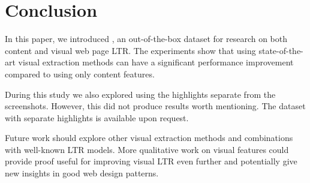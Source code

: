 
\section{Conclusion}
In this paper, we introduced \datasetname, an out-of-the-box dataset for research on both content and visual web page \ac{LTR}. The experiments show that using state-of-the-art visual extraction methods can have a significant performance improvement compared to using only content features. 

 During this study we also explored using the highlights separate from the screenshots. However, this did not produce results worth mentioning. The dataset with separate highlights is available upon request. 
\fi

Future work should explore other visual extraction methods and combinations with well-known \ac{LTR} models. More qualitative work on visual features could provide proof useful for improving visual \ac{LTR} even further and potentially give new insights in good web design patterns. 

